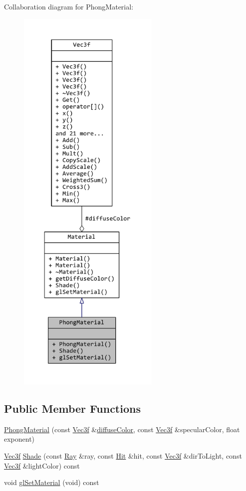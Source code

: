 Collaboration diagram for Phong\+Material\+:
\nopagebreak
\begin{figure}[H]
\begin{center}
\leavevmode
\includegraphics[height=550pt]{classPhongMaterial__coll__graph}
\end{center}
\end{figure}
\subsection*{Public Member Functions}
\begin{DoxyCompactItemize}
\item 
\hyperlink{classPhongMaterial_a89cbc561f93291ffa07e4fee6408fdca}{Phong\+Material} (const \hyperlink{classVec3f}{Vec3f} \&\hyperlink{classMaterial_ae81bccaee22b88d46074b843dc7bdc32}{diffuse\+Color}, const \hyperlink{classVec3f}{Vec3f} \&specular\+Color, float exponent)
\item 
\hyperlink{classVec3f}{Vec3f} \hyperlink{classPhongMaterial_aa35744f32b0505bd60e4295e0ba87b28}{Shade} (const \hyperlink{classRay}{Ray} \&ray, const \hyperlink{classHit}{Hit} \&hit, const \hyperlink{classVec3f}{Vec3f} \&dir\+To\+Light, const \hyperlink{classVec3f}{Vec3f} \&light\+Color) const 
\item 
void \hyperlink{classPhongMaterial_aaba23700fd0826e36aba3ea9945b4922}{gl\+Set\+Material} (void) const 
\end{DoxyCompactItemize}
